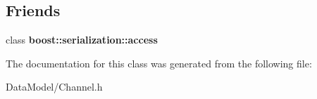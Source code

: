 \subsection*{Friends}
\begin{DoxyCompactItemize}
\item 
\hypertarget{classChannel_ac98d07dd8f7b70e16ccb9a01abf56b9c}{
class {\bfseries boost::serialization::access}}
\label{classChannel_ac98d07dd8f7b70e16ccb9a01abf56b9c}

\end{DoxyCompactItemize}


The documentation for this class was generated from the following file:\begin{DoxyCompactItemize}
\item 
DataModel/Channel.h\end{DoxyCompactItemize}
